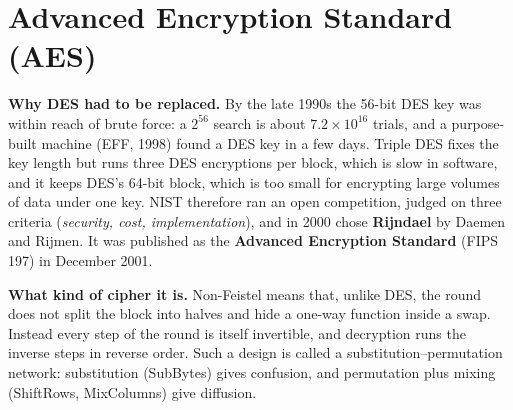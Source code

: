 \providecommand{\aesM}[1]{\left(\begin{tabular}{@{\hspace{2pt}}>{\ttfamily}c@{\hspace{5pt}}>{\ttfamily}c@{\hspace{5pt}}>{\ttfamily}c@{\hspace{5pt}}>{\ttfamily}c@{\hspace{2pt}}}#1\end{tabular}\right)}
\providecommand{\aesB}[1]{\textcolor{acc}{\textbf{#1}}}

\section{Advanced Encryption Standard (AES)}\label{sec:aes}

\textbf{Why DES had to be replaced.} By the late 1990s the 56-bit DES key was within reach of brute force: a $2^{56}$ search is about $7.2 \times 10^{16}$ trials, and a purpose-built machine (EFF, 1998) found a DES key in a few days. Triple DES fixes the key length but runs three DES encryptions per block, which is slow in software, and it keeps DES's 64-bit block, which is too small for encrypting large volumes of data under one key. NIST therefore ran an open competition, judged on three criteria (\emph{security, cost, implementation}), and in 2000 chose \textbf{Rijndael} by Daemen and Rijmen. It was published as the \textbf{Advanced Encryption Standard} (FIPS 197) in December 2001.

\textbf{What kind of cipher it is.}  Non-Feistel means that, unlike DES, the round does not split the block into halves and hide a one-way function inside a swap. Instead every step of the round is itself invertible, and decryption runs the inverse steps in reverse order. Such a design is called a substitution--permutation network: substitution (SubBytes) gives confusion, and permutation plus mixing (ShiftRows, MixColumns) give diffusion.

